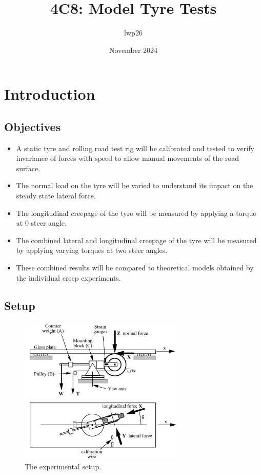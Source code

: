 \documentclass{article}
\begin{document}
\title{4C8: Model Tyre Tests}
\author{lwp26}
\date{November 2024}
\maketitle 

\section{Introduction}

\subsection{Objectives}

\begin{itemize}
    \item A static tyre and rolling road test rig will be calibrated and tested to verify invariance of forces with speed to allow manual movements of the road surface.
    \item The normal load on the tyre will be varied to understand its impact on the steady state lateral force.
    \item The longitudinal creepage of the tyre will be measured by applying a torque at 0 steer angle.
    \item The combined lateral and longitudinal creepage of the tyre will be measured by applying varying torques at two steer angles.
    \item These combined results will be compared to theoretical models obtained by the individual creep experiments.
\end{itemize}

\subsection{Setup}

\begin{figure}[H]
    \centering
    \includegraphics[width=0.7\textwidth]{photos/setup.png}
    \caption{The experimental setup.}
    \label{fig:setup}
\end{figure}
\end{document}
